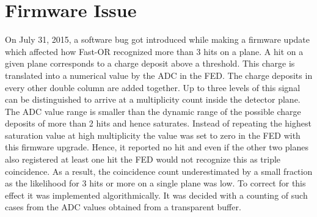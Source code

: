 \section{Firmware Issue} \label{sec:firmware}


On July 31, 2015, a software bug got introduced while making a firmware update which affected how Fast-OR recognized more than 3 hits on a plane. A hit on a given plane corresponds to a charge deposit above a threshold. This charge is translated into a numerical value by the ADC in the FED. The charge deposits in every other double column are added together. Up to three levels of this signal can be distinguished to arrive at a multiplicity count inside the detector plane. The ADC value range is smaller than the dynamic range of the possible charge deposits of more than 2 hits and hence saturates. Instead of repeating the highest saturation value at high multiplicity the value was set to zero in the FED with this firmware upgrade. Hence, it reported no hit and even if the other two planes also registered at least one hit the FED would not recognize this as triple coincidence. As a result, the coincidence count underestimated by a small fraction as the likelihood for 3 hits or more on a single plane was low. To correct for this effect it was implemented algorithmically. It was decided with a counting of such cases from the ADC values obtained from a transparent buffer. 




%

